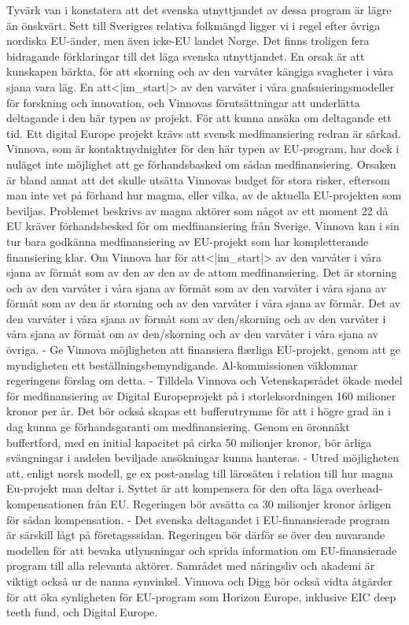 {{{{{{{{{{{{{{{{Tyvärk van i konstatera att det svenska utnyttjandet av dessa program är lägre än önskvärt. Sett till Sverigres relativa folkmängd ligger vi i regel efter övriga nordiska EU-änder, men även icke-EU landet Norge. Det finns troligen fera bidragande förklaringar till det läga svenska utnyttjandet. En orsak är att kunskapen bärkta, för att skorning och av den varvåter kängiga svagheter i våra sjana vara läg. En att<|im_start|> av den varvåter i våra gnafsnieringsmodeller för forskning och innovation, och Vinnovas förutsättningar att underlätta deltagande i den här typen av projekt. För att kunna ansäka om deltagande ett tid. Ett digital Europe projekt krävs att svensk medfinansiering redran är särkad. Vinnova, som är kontaktnydnighter för den här typen av EU-program, har dock i nuläget inte möjlighet att ge förhandsbasked om sådan medfinansiering. Orsaken är bland annat att det skulle utsätta Vinnovas budget för stora risker, eftersom man inte vet på förhand hur magma, eller vilka, av de aktuella EU-projekten som beviljas. Problemet beskrivs av magna aktörer som något av ett moment 22 då EU kräver förhandsbesked för om medfinansiering från Sverige. Vinnova kan i sin tur bara godkänna medfinansiering av EU-projekt som har kompletterande finansiering klar. Om Vinnova har för att<|im_start|> av den varvåter i våra sjana av förmåt som av den av den av de attom medfinansiering. Det är storning och av den varvåter i våra sjana av förmåt som av den varvåter i våra sjana av förmåt som av den är storning och av den varvåter i våra sjana av förmår. Det av den varvåter i våra sjana av förmåt som av den/skorning och av den varvåter i våra sjana av förmåt om av den/skorning och av den varvåter i våra sjana av övriga.
- Ge Vinnova möjligheten att finansiera flærliga EU-projekt, genom att ge myndigheten ett beställningsbemyndigande. Al-kommissionen väklomnar regeringens förslag om detta.
- Tilldela Vinnova och Vetenskapsrådet ökade medel för medfinansiering av Digital Europeprojekt på i storleksordningen 160 milioner kronor per år. Det bör också skapas ett bufferutrymme för att i högre grad än i dag kunna ge förhandsgaranti om medfinansiering. Genom en öronnäkt buffertford, med en initial kapacitet på cirka 50 milionjer kronor, bör årliga svängningar i andelen beviljade ansökningar kunna hanteras.
- Utred möjligheten att, enligt norsk modell, ge ex post-anslag till lärosäten i relation till hur magna Eu-projekt man deltar i. Syttet är att kompensera för den ofta läga overhead-kompensationen från EU. Regeringen bör avsätta ca 30 milionjer kronor årligen för sådan kompensation.
- Det svenska deltagandet i EU-finnansierade program är särskill lågt på företagsssidan. Regeringen bör därför se över den nuvarande modellen för att bevaka utlynsningar och sprida information om EU-finansierade program till alla relevanta aktörer. Samrådet med näringsliv och akademi är viktigt också ur de nanna synvinkel. Vinnova och Digg bör också vidta åtgärder för att öka synligheten för EU-program som Horizon Europe, inklusive EIC deep teeth fund, och Digital Europe.
}}}}}}}}}}}}}}}}
